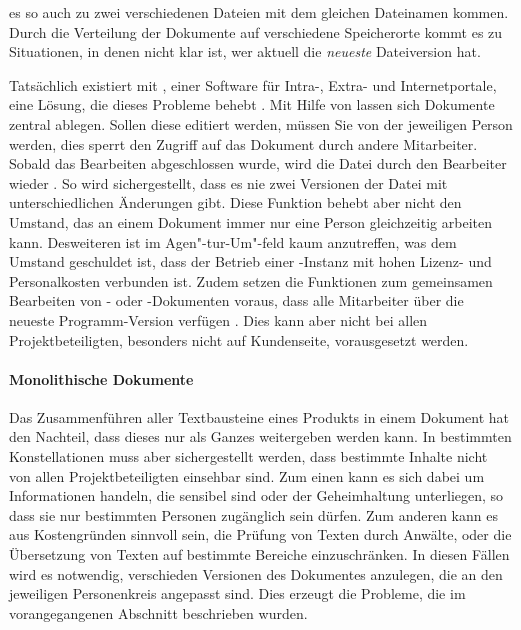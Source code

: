 es so auch zu zwei verschiedenen Dateien mit dem gleichen Dateinamen kommen. Durch die Verteilung der Dokumente auf verschiedene Speicherorte kommt es zu Situationen, in denen nicht klar ist, wer aktuell die \emph{neueste} Dateiversion hat.

Tatsächlich existiert mit  , einer Software für Intra-, Extra- und Internetportale, eine Lösung, die dieses Probleme behebt \cite{sharepoint-shared-documents}. Mit Hilfe von  lassen sich Dokumente zentral ablegen. Sollen diese editiert werden, müssen Sie von der jeweiligen Person  werden, dies sperrt den Zugriff auf das Dokument durch andere Mitarbeiter. Sobald das Bearbeiten abgeschlossen wurde, wird die Datei durch den Bearbeiter wieder . So wird sichergestellt, dass es nie zwei Versionen der Datei mit unterschiedlichen Änderungen gibt. Diese Funktion behebt aber nicht den Umstand, das an einem Dokument immer nur eine Person gleichzeitig arbeiten kann. Desweiteren ist  im Agen"-tur-Um"-feld kaum anzutreffen, was dem Umstand geschuldet ist, dass der Betrieb einer -Instanz mit hohen Lizenz- und Personalkosten verbunden ist. Zudem setzen die Funktionen zum gemeinsamen Bearbeiten von - oder -Dokumenten voraus, dass alle Mitarbeiter über die neueste Programm-Version verfügen \cite{sharepoint-wordversions}. Dies kann aber nicht bei allen Projektbeteiligten, besonders nicht auf Kundenseite, vorausgesetzt werden.

\paragraph{Monolithische Dokumente} Das Zusammenführen aller Textbausteine eines Produkts in einem Dokument hat den Nachteil, dass dieses nur als Ganzes weitergeben werden kann. In bestimmten Konstellationen muss aber sichergestellt werden, dass bestimmte Inhalte nicht von allen Projektbeteiligten einsehbar sind. Zum einen kann es sich dabei um Informationen handeln, die sensibel sind oder der Geheimhaltung unterliegen, so dass sie nur bestimmten Personen zugänglich sein dürfen. Zum anderen kann es aus Kostengründen sinnvoll sein, die Prüfung von Texten durch Anwälte, oder die Übersetzung von Texten auf bestimmte Bereiche einzuschränken. In diesen Fällen wird es notwendig, verschieden Versionen des Dokumentes anzulegen, die an den jeweiligen Personenkreis angepasst sind. Dies erzeugt die Probleme, die im vorangegangenen Abschnitt beschrieben wurden.

